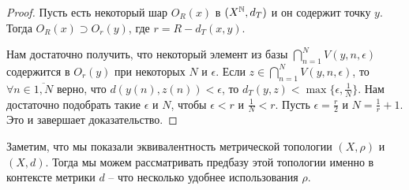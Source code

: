 \begin{example}
\begin{proof}
        Пусть есть некоторый шар $O_R(x)$ в $(X^{\mathbb{N}}, d_T)$ и он содержит точку $y$.
        Тогда $O_R(x) \supset O_r(y)$, где $r = R - d_T(x, y)$.

        Нам достаточно получить, что некоторый элемент из базы $\bigcap_{n = 1}^{N} V(y, n, \epsilon)$ содержится в $O_r(y)$ при некоторых $N$ и $\epsilon$.
        Если $z \in \bigcap_{n = 1}^{N} V(y, n, \epsilon)$, то $\forall n \in \overline{1, N}$ верно, что $d(y(n), z(n)) < \epsilon$, то $d_T(y, z) < \max\{\epsilon, \frac{1}{N}\}$.
        Нам достаточно подобрать такие $\epsilon$ и $N$, чтобы $\epsilon < r$ и $\frac{1}{N} < r$.
        Пусть $\epsilon = \frac{r}{2}$ и $N = \frac{1}{r} + 1$.
        Это и завершает доказательство.
    \end{proof}
    \begin{notet}
        Заметим, что мы показали эквивалентность метрической топологии $(X, \rho)$ и $(X, d)$.
        Тогда мы можем рассматривать предбазу этой топологии именно в контексте метрики $d$ -- что несколько удобнее использования $\rho$.
    \end{notet}
    
\end{example}
